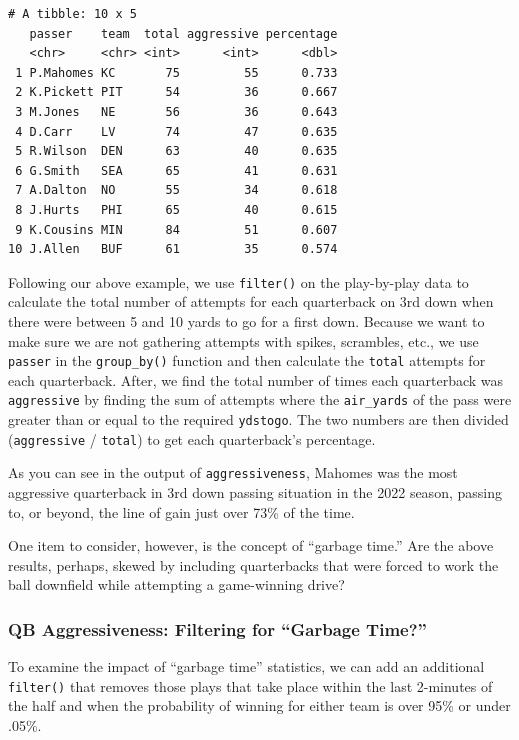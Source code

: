 \documentclass[
  letterpaper,
]{krantz}
\begin{document}
\begin{verbatim}
# A tibble: 10 x 5
   passer    team  total aggressive percentage
   <chr>     <chr> <int>      <int>      <dbl>
 1 P.Mahomes KC       75         55      0.733
 2 K.Pickett PIT      54         36      0.667
 3 M.Jones   NE       56         36      0.643
 4 D.Carr    LV       74         47      0.635
 5 R.Wilson  DEN      63         40      0.635
 6 G.Smith   SEA      65         41      0.631
 7 A.Dalton  NO       55         34      0.618
 8 J.Hurts   PHI      65         40      0.615
 9 K.Cousins MIN      84         51      0.607
10 J.Allen   BUF      61         35      0.574
\end{verbatim}

Following our above example, we use \texttt{filter()} on the
play-by-play data to calculate the total number of attempts for each
quarterback on 3rd down when there were between 5 and 10 yards to go for
a first down. Because we want to make sure we are not gathering attempts
with spikes, scrambles, etc., we use \texttt{passer} in the
\texttt{group\_by()} function and then calculate the \texttt{total}
attempts for each quarterback. After, we find the total number of times
each quarterback was \texttt{aggressive} by finding the sum of attempts
where the \texttt{air\_yards} of the pass were greater than or equal to
the required \texttt{ydstogo}. The two numbers are then divided
(\texttt{aggressive} / \texttt{total}) to get each quarterback's
percentage.

As you can see in the output of \texttt{aggressiveness}, Mahomes was the
most aggressive quarterback in 3rd down passing situation in the 2022
season, passing to, or beyond, the line of gain just over 73\% of the
time.

One item to consider, however, is the concept of ``garbage time.'' Are
the above results, perhaps, skewed by including quarterbacks that were
forced to work the ball downfield while attempting a game-winning drive?

\hypertarget{qb-aggressiveness-filtering-for-garbage-time}{%
\subsubsection{QB Aggressiveness: Filtering for ``Garbage
Time?''}\label{qb-aggressiveness-filtering-for-garbage-time}}

To examine the impact of ``garbage time'' statistics, we can add an
additional \texttt{filter()} that removes those plays that take place
within the last 2-minutes of the half and when the probability of
winning for either team is over 95\% or under .05\%.
\end{document}

